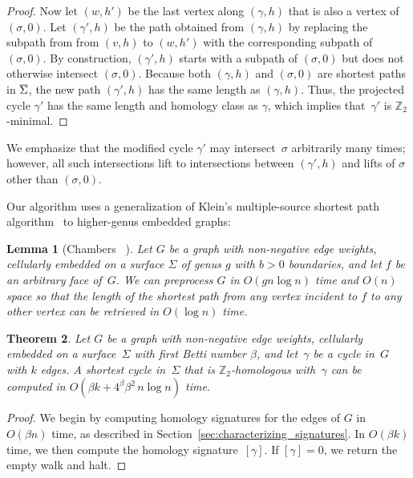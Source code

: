 \documentclass[11pt,twoside]{article}
\def\Z{\mathbb{Z}}
\def\cycle{\gamma}
\def\Sigmabar{\overline{\smash{\Sigma}\vphantom{t}}}
\newtheorem{theorem}{Theorem}[section]
\newtheorem{lemma}[theorem]{Lemma}
\begin{document}
{\begin{proof}
Now let $(w,h')$ be the last vertex along $(\cycle,h)$ that is also a vertex of $(\sigma,0)$.  Let $(\cycle', h)$ be the path obtained from $(\cycle, h)$ by replacing the subpath from from $(v,h)$ to $(w,h')$ with the corresponding subpath of $(\sigma,0)$.  By construction, $(\cycle', h)$ starts with a subpath of $(\sigma,0)$ but does not otherwise intersect $(\sigma,0)$.   Because both $(\cycle, h)$ and $(\sigma,0)$ are shortest paths in $\Sigmabar$, the new path $(\cycle', h)$ has the same length as $(\cycle, h)$.  Thus, the projected cycle $\cycle'$ has the same length and homology class as $\cycle$, which implies that~$\cycle'$ is $\Z_2$-minimal.
\end{proof}

We emphasize that the modified cycle $\cycle'$ may intersect~$\sigma$ arbitrarily many times; however, all such intersections lift to intersections between $(\cycle', h)$ and lifts of $\sigma$ other than $(\sigma, 0)$.

Our algorithm uses a generalization of Klein's  multiple-source shortest path algorithm~\cite{k-msspp-05} to higher-genus embedded graphs:

\begin{lemma}[Chambers \etal~\cite{cce-msspe-13}]
\label{lem:multishort}
Let $G$ be a graph with non-negative edge weights, cellularly embedded on a surface $\Sigma$ of genus $g$ with $b>0$ boundaries, and let $f$ be an arbitrary face of~$G$.  We can preprocess $G$ in $O(gn\log n)$ time and $O(n)$ space so that the length of the shortest path from any vertex incident to $f$ to any other vertex can be retrieved in $O(\log n)$ time.
\end{lemma}

\begin{theorem}
\label{thm:min-cycle}
Let $G$ be a  graph with non-negative edge weights, cellularly embedded on a surface~$\Sigma$ with first Betti number $\beta$, and let~$\cycle$ be a cycle in~$G$ with $k$ edges.  A shortest cycle in~$\Sigma$ that is $\Z_2$-homologous with~$\cycle$ can be computed in $O(\beta k + 4^\beta \beta^2\, n\log n)$ time.
\end{theorem}

\begin{proof}
We begin by computing homology signatures for the edges of $G$ in $O(\beta n)$ time, as described in Section~\ref{sec:characterizing_signatures}.  In $O(\beta k)$ time, we then compute the homology signature~$[\cycle]$.  If $[\cycle] = 0$, we return the empty walk and halt.


\end{proof}}
\end{document}
